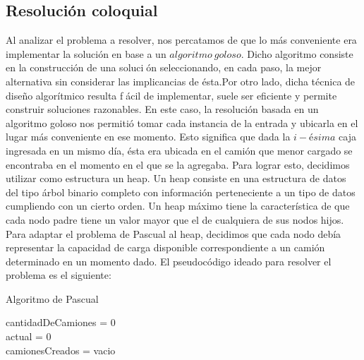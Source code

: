 \subsection{Resolución coloquial}
Al analizar el problema a resolver, nos percatamos de que lo más conveniente era implementar la solución en base a un $algoritmo\ goloso$. Dicho algoritmo consiste en la construcción de una solución seleccionando, en cada paso, la mejor alternativa sin considerar las implicancias de ésta.\newline Por otro lado, dicha técnica de diseño algorítmico resulta fácil de implementar, suele ser eficiente y permite construir soluciones razonables.\newline
\newline
En este caso, la resolución basada en un algoritmo goloso nos permitió tomar cada instancia de la entrada y ubicarla en el lugar más conveniente en ese momento. Esto significa que dada la $i-ésima$ caja ingresada en un mismo día, ésta era ubicada en el camión que menor cargado se encontraba en el momento en el que se la agregaba. Para lograr esto, decidimos utilizar como estructura un heap.\newline
\newline
Un heap consiste en una estructura de datos del tipo árbol binario completo con información perteneciente a un tipo de datos cumpliendo con un cierto orden. Un heap máximo tiene la característica de que cada nodo padre tiene un valor mayor que el de cualquiera de sus nodos hijos.\newline
Para adaptar el problema de Pascual al heap, decidimos que cada nodo debía representar la capacidad de carga disponible correspondiente a un camión determinado en un momento dado.\newline
\newline
El pseudocódigo ideado para resolver el problema es el siguiente:\newline

\begin{algorithm}[H]
	\SetAlgoLined
	\caption{Algoritmo de Pascual}
	cantidadDeCamiones = 0\\
	actual = 0\\
	camionesCreados = vacio\
\end{algorithm}

